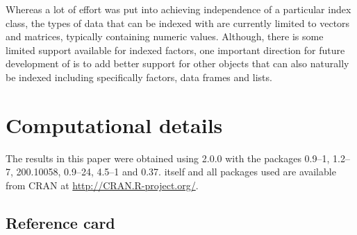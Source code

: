 \documentclass{Z}
\begin{document}
Whereas a lot of effort was put into achieving independence of a particular
index class, the types of data that can be indexed with  are currently
limited to vectors and matrices, typically containing numeric values. Although,
there is some limited support available for indexed factors, one important 
direction for future development of  is to add better support for other
objects that can also naturally be indexed including specifically factors, data
frames and lists.



\section*{Computational details}

The results in this paper were obtained using 
2.0.0 with the packages
 0.9--1,
 1.2--7,
 200.10058,
 0.9--24,
 4.5--1 and
 0.37.
 itself and all packages used are available from
CRAN at \url{http://CRAN.R-project.org/}.




\begin{appendix}
\section{Reference card}

\end{appendix}
\end{document}
